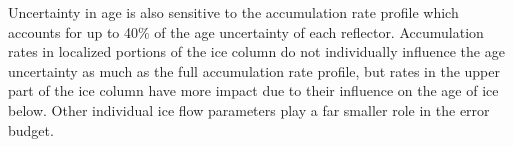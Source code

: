 Uncertainty in age is also sensitive to the accumulation rate profile which accounts for up to 40\% of the age uncertainty of each reflector. 
Accumulation rates in localized portions of the ice column do not individually influence the age uncertainty as much as the full accumulation rate profile, but rates in the upper part of the ice column have more impact due to their influence on the age of ice below. Other individual ice flow parameters play a far smaller role in the error budget.










